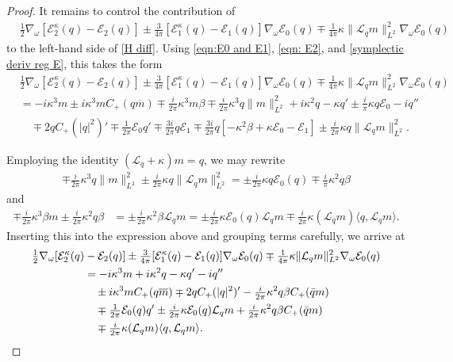 \documentclass{amsart}
\numberwithin{equation}{section}
\theoremstyle{definition}
\newcommand{\om}{\omega}
\newcommand{\ka}{\kappa}
\newcommand{\E}{\mathcal{E}}
\newcommand{\Lc}{\mathcal{L}}
\newcommand{\na}{\nabla}
\begin{document}
\begin{proof}
It remains to control the contribution of
\begin{align*}
&\tfrac12\na_\om [\E_2^\ka(q)-\E_2(q)] \pm \tfrac3{4\pi}[\E_1^\ka(q)-\E_1(q)]\na_\om \E_0(q) \mp\tfrac1{4\pi}\ka \|\Lc_q m\|_{L^2}^2\na_\om \E_0(q)
\end{align*}
to the left-hand side of \eqref{H diff}. Using \eqref{eqn:E0 and E1}, \eqref{eqn: E2}, and \eqref{symplectic deriv reg E}, this takes the form
\begin{align*}
&\tfrac12\na_\om [\E_2^\ka(q)-\E_2(q)] \pm \tfrac3{4\pi}[\E_1^\ka(q)-\E_1(q)]\na_\om \E_0(q) \mp\tfrac1{4\pi}\ka \|\Lc_q m\|_{L^2}^2\na_\om \E_0(q)\\
&=-i\ka^3m\pm i\ka^3m C_+(q\overline{m})\mp\tfrac{i}{2\pi} \ka^3 m \beta\mp\tfrac{i}{2\pi}\ka^3q\|m \|^2_{L^2} +i\ka^2 q  -\ka q'\pm\tfrac{i}{\pi}\ka q\mathcal{E}_0-iq''\\
&\quad \mp2qC_+(|q|^2)'\mp \tfrac1{2\pi}\mathcal{E}_0q'\mp\tfrac{3i}{2\pi}q\mathcal{E}_1 \mp \tfrac{3i}{2\pi}q [-\ka^2\beta+\ka \E_0-\E_1]\pm \tfrac{i}{2\pi}\ka q \|\Lc_q m\|_{L^2}^2.
\end{align*}

Employing the identity $(\Lc_q+\ka)m=q$, we may rewrite 
\begin{align*}
\mp\tfrac{i}{2\pi}\ka^3q\|m \|^2_{L^2} \pm \tfrac{i}{2\pi}\ka q \|\Lc_q m\|_{L^2}^2 = \pm\tfrac{i}{2\pi}\ka q\E_0(q) \mp \tfrac{i}{\pi}\ka^2 q\beta
\end{align*}
and
\begin{align*}
 \mp\tfrac{i}{2\pi} \ka^3  \beta m \pm \tfrac{i}{2\pi} \ka^2  q\beta &=\pm \tfrac{i}{2\pi} \ka^2 \beta\Lc_qm = \pm \tfrac{i}{2\pi}\ka \E_0(q) \Lc_qm\mp \tfrac{i}{2\pi}\ka (\Lc_qm)\langle q, \Lc_qm\rangle. 
\end{align*}
Inserting this into the expression above and grouping terms carefully, we arrive at
\begin{align}
\tfrac12\na_\om [\E_2^\ka(q)&-\E_2(q)] \pm \tfrac3{4\pi}[\E_1^\ka(q)-\E_1(q)]\na_\om \E_0(q) \mp\tfrac1{4\pi}\ka \|\Lc_q m\|_{L^2}^2\na_\om \E_0(q)\notag\\
&=-i\ka^3m +i\ka^2 q -\ka q' -iq''  \label{07}\\
&\quad \pm i\ka^3m C_+(q\overline{m})\mp2qC_+(|q|^2)'-\tfrac{i}{2\pi}\ka^2q\beta C_+(\bar q m)\label{08}\\
&\quad\mp \tfrac1{2\pi}\mathcal{E}_0(q)q' \pm \tfrac{i}{2\pi}\ka \E_0(q) \Lc_qm +\tfrac{i}{2\pi}\ka^2q\beta C_+(\bar q m)\label{09}\\
&\quad\mp \tfrac{i}{2\pi}\ka (\Lc_qm)\langle q, \Lc_qm\rangle.\label{10}
\end{align}


\end{proof}
\end{document}
